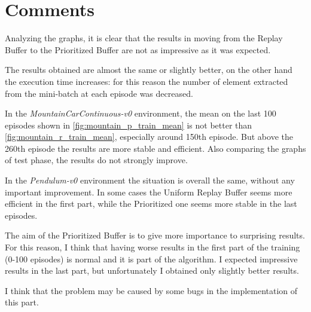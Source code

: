 \documentclass[a4paper, 11pt]{article}
\begin{document}
	\newpage
	\section{Comments} \label{final}
	
	Analyzing the graphs, it is clear that the results in moving from the Replay Buffer to the Prioritized Buffer are not as impressive as it was expected.
	
	The results obtained are almost the same or slightly better, on the other hand the execution time increases: for this reason the number of element extracted from the mini-batch at each episode was decreased.
	
	In the \textit{MountainCarContinuous-v0} environment, the mean on the last 100 episodes shown in \vref{fig:mountain_p_train_mean} is not better than \vref{fig:mountain_r_train_mean}, especially around 150th episode. But above the 260th episode the results are more stable and efficient.
	Also comparing the graphs of test phase, the results do not strongly improve.
	
	In the \textit{Pendulum-v0} environment the situation is overall the same, without any important improvement. In some cases the Uniform Replay Buffer seems more efficient in the first part, while the Prioritized one seems more stable in the last episodes.
	
	The aim of the Prioritized Buffer is to give more importance to surprising results. For this reason, I think that having worse results in the first part of the training (0-100 episodes) is normal and it is part of the algorithm. I expected impressive results in the last part, but unfortunately I obtained only slightly better results.
	
	I think that the problem may be caused by some bugs in the implementation of this part.
		
\end{document}
